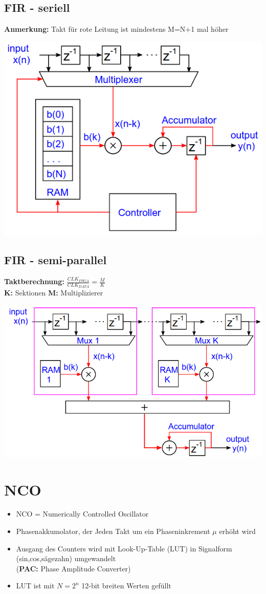 \documentclass[10pt,a4paper]{article}
\begin{document}
\subsection{FIR - seriell}
\textbf{Anmerkung: } Takt für rote Leitung ist mindestens M=N+1 mal höher
  \begin{center}
      \includegraphics[width=.35\textwidth]{./img/firseriell.png}
  \end{center}

\subsection{FIR - semi-parallel}
\textbf{Taktberechnung: } $\frac{CLK_{FPGA}}{CLK_{DATA}} = \frac{M}{K}$\\
 \textbf{K:} Sektionen \textbf{M:} Multiplizierer \\

  \begin{center}
      \includegraphics[width=.35\textwidth]{./img/firsemi.png}
  \end{center}





\section{NCO}
\begin{itemize}
  \item NCO = \grqq{}Numerically Controlled Oscillator\grqq{}
  \item Phasenakkumolator, der Jeden Takt um ein Phaseninkrement $\mu$ erhöht wird
  \item Ausgang des Counters wird mit Look-Up-Table (LUT) in Signalform (sin,cos,sägezahn) umgewandelt \\(\textbf{PAC:} Phase Amplitude Converter)
  \item LUT ist mit $N = 2^n$ 12-bit breiten Werten gefüllt 
\end{itemize}
\end{document}
